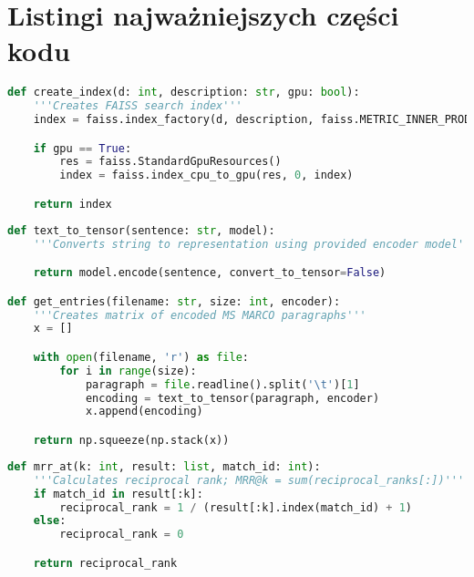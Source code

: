 \break

\section{Listingi najważniejszych części kodu}

\begin{lstlisting}[language=Python, caption={Tworzenie indeksu\protect\footnotemark[3]}] 
def create_index(d: int, description: str, gpu: bool):
    '''Creates FAISS search index'''
    index = faiss.index_factory(d, description, faiss.METRIC_INNER_PRODUCT)

    if gpu == True:
        res = faiss.StandardGpuResources()
        index = faiss.index_cpu_to_gpu(res, 0, index)

    return index
\end{lstlisting}

\begin{lstlisting}[language=Python, caption={Przetwarzanie zbioru danych\protect\footnotemark[3]}]
def text_to_tensor(sentence: str, model):
    '''Converts string to representation using provided encoder model'''

    return model.encode(sentence, convert_to_tensor=False)

def get_entries(filename: str, size: int, encoder):
    '''Creates matrix of encoded MS MARCO paragraphs'''
    x = []

    with open(filename, 'r') as file:
        for i in range(size):
            paragraph = file.readline().split('\t')[1]
            encoding = text_to_tensor(paragraph, encoder)
            x.append(encoding)

    return np.squeeze(np.stack(x))
\end{lstlisting}

\begin{lstlisting}[language=Python, caption={Sposób obliczania MRR\protect\footnotemark[3]}]
def mrr_at(k: int, result: list, match_id: int):
    '''Calculates reciprocal rank; MRR@k = sum(reciprocal_ranks[:])'''
    if match_id in result[:k]:        
        reciprocal_rank = 1 / (result[:k].index(match_id) + 1)
    else:
        reciprocal_rank = 0

    return reciprocal_rank
\end{lstlisting}

